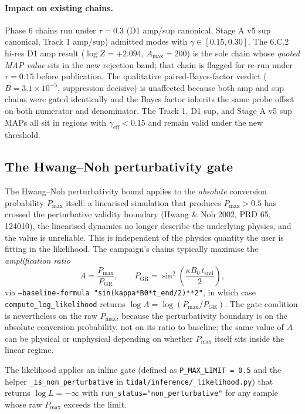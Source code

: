 \paragraph{Impact on existing chains.}
Phase 6 chains run under $\tau = 0.3$ (D1 amp/sup canonical, Stage A
v5 sup canonical, Track 1 amp/sup) admitted modes with
$\gamma \in [0.15, 0.30]$. The 6.C.2 hi-res D1 amp result
($\log Z = +2.094$, $A_{\max} = 200$) is the sole chain whose
\emph{quoted MAP value} sits in the new rejection band; that chain is
flagged for re-run under $\tau = 0.15$ before publication. The
qualitative paired-Bayes-factor verdict
($B = 3.1 \times 10^{-5}$, suppression decisive) is unaffected because
both amp and sup chains were gated identically and the Bayes factor
inherits the same probe offset on both numerator and denominator. The
Track 1, D1 sup, and Stage A v5 sup MAPs all sit in regions with
$\gamma_{\text{eff}} < 0.15$ and remain valid under the new threshold.

\subsection{The Hwang--Noh perturbativity gate}

The Hwang--Noh perturbativity bound applies to the \emph{absolute}
conversion probability $P_{\max}$ itself: a linearised simulation
that produces $P_{\max} > 0.5$ has crossed the perturbative validity
boundary (Hwang \& Noh 2002, PRD 65, 124010), the linearised
dynamics no longer describe the underlying physics, and the value is
unreliable. This is independent of the physics quantity the user is
fitting in the likelihood. The campaign's chains typically maximise
the \emph{amplification ratio}
\begin{equation}
A = \frac{P_{\max}}{P_{\mathrm{GR}}}, \qquad
P_{\mathrm{GR}} = \sin^2\!\left(\frac{\kappa B_0\, t_{\text{end}}}{2}\right),
\end{equation}
via \texttt{--baseline-formula
"sin(kappa*B0*t\_end/2)**2"}, in which case
\texttt{compute\_log\_likelihood} returns
$\log A = \log(P_{\max} / P_{\mathrm{GR}})$. The gate condition is
nevertheless on the raw $P_{\max}$, because the perturbativity boundary
is on the absolute conversion probability, not on its ratio to
baseline; the same value of $A$ can be physical or unphysical
depending on whether $P_{\max}$ itself sits inside the linear regime.

The likelihood applies an inline gate (defined as
\texttt{P\_MAX\_LIMIT = 0.5} and the helper
\texttt{\_is\_non\_perturbative} in
\texttt{tidal/inference/\_likelihood.py}) that returns
$\log L = -\infty$ with \texttt{run\_status="non\_perturbative"} for
any sample whose raw $P_{\max}$ exceeds the limit.

